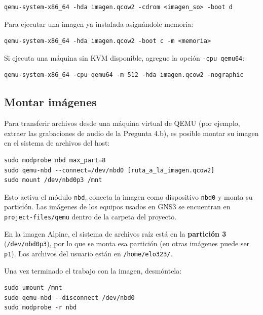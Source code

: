 \documentclass[letterpaper,12pt]{article}
\begin{document}
\begin{lstlisting}
qemu-system-x86_64 -hda imagen.qcow2 -cdrom <imagen_so> -boot d
\end{lstlisting}

Para ejecutar una imagen ya instalada asignándole memoria:

\begin{lstlisting}
qemu-system-x86_64 -hda imagen.qcow2 -boot c -m <memoria>
\end{lstlisting}

\begin{nota}
Si ejecuta una máquina sin KVM disponible, agregue la opción \texttt{-cpu qemu64}:
\begin{lstlisting}
qemu-system-x86_64 -cpu qemu64 -m 512 -hda imagen.qcow2 -nographic
\end{lstlisting}
\end{nota}

\subsection{Montar imágenes}

Para transferir archivos desde una máquina virtual de QEMU (por ejemplo, extraer las grabaciones de audio de la Pregunta 4.b), es posible montar su imagen en el sistema de archivos del host:

\begin{lstlisting}
sudo modprobe nbd max_part=8
sudo qemu-nbd --connect=/dev/nbd0 [ruta_a_la_imagen.qcow2]
sudo mount /dev/nbd0p3 /mnt
\end{lstlisting}

Esto activa el módulo \texttt{nbd}, conecta la imagen como dispositivo \texttt{nbd0} y monta su partición. Las imágenes de los equipos usados en GNS3 se encuentran en \texttt{project-files/qemu} dentro de la carpeta del proyecto.

\begin{nota}
En la imagen Alpine, el sistema de archivos raíz está en la \textbf{partición 3} (\texttt{/dev/nbd0p3}), por lo que se monta esa partición (en otras imágenes puede ser \texttt{p1}). Los archivos del usuario están en \texttt{/home/elo323/}.
\end{nota}

Una vez terminado el trabajo con la imagen, desmóntela:

\begin{lstlisting}
sudo umount /mnt
sudo qemu-nbd --disconnect /dev/nbd0
sudo modprobe -r nbd
\end{lstlisting}
\end{document}
